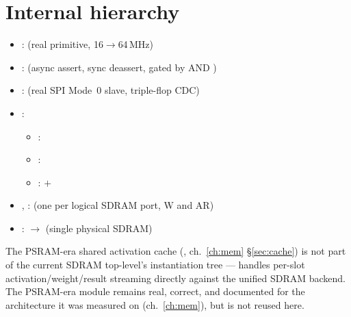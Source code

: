 \section{Internal hierarchy}
\noindent{}
\begin{itemize}[leftmargin=2.4em]
\footnotesize
\item {} :  (real  primitive, 16$\to$64\,MHz)
\item {} :  (async assert, sync deassert, gated by  AND )
\item {} :  (real SPI Mode~0 slave, triple-flop CDC)
\item {} : 
  \begin{itemize}
    \item {} : 
    \item {} : 
    \item {}:  $+$ 
  \end{itemize}
\item {},  :  (one per logical SDRAM port, W and AR)
\item {} :  $\to$  (single physical SDRAM)
\end{itemize}

\begin{fnnote}
The PSRAM-era shared activation cache (,
ch.~\ref{ch:mem} \S\ref{sec:cache}) is not part of the current SDRAM
top-level's instantiation tree --- 
handles per-slot activation/weight/result streaming directly against
the unified SDRAM backend. The PSRAM-era module remains real, correct,
and documented for the architecture it was measured on
(ch.~\ref{ch:mem}), but is not reused here.
\end{fnnote}
